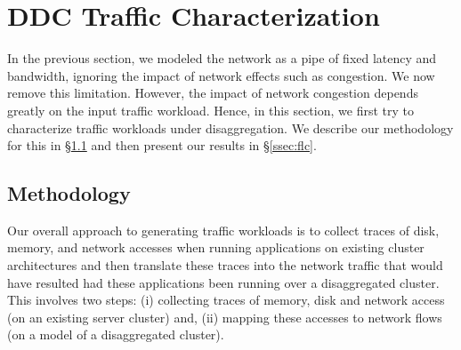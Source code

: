 \section{DDC Traffic Characterization}
\label{sec:workloads}

In the previous section, we modeled the network as a pipe of
fixed latency and bandwidth, ignoring the impact of network effects 
such as congestion. We now remove this limitation. 
However, the impact of network congestion depends greatly
on the input traffic workload. Hence, in this section, we first try to
characterize traffic workloads under disaggregation.
We describe our methodology for this in \S\ref{ssec:method1} and then present our results in \S\ref{ssec:flc}.

\subsection{Methodology}
\label{ssec:method1} 

Our overall approach to generating traffic workloads is to collect traces 
of disk, memory, and network accesses when running applications on 
existing cluster architectures and then translate these traces into the 
network traffic that would have resulted had these applications been 
running over a disaggregated cluster. 
This involves two steps: (i) collecting traces of memory, disk and network 
access (on an existing server cluster) and, (ii) mapping these accesses to network flows (on a model of a disaggregated cluster).

